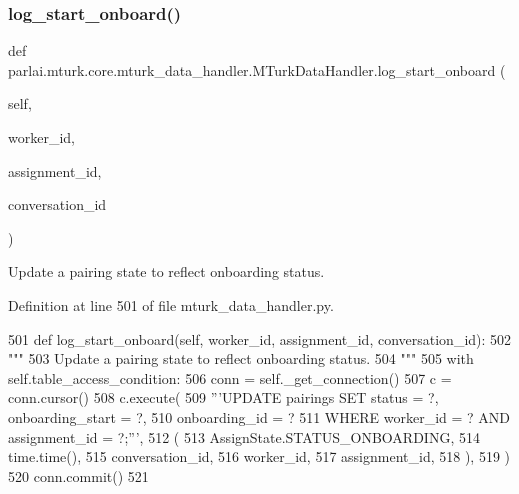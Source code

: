 \subsubsection{\texorpdfstring{log\+\_\+start\+\_\+onboard()}{log\_start\_onboard()}}
{\footnotesize\ttfamily def parlai.\+mturk.\+core.\+mturk\+\_\+data\+\_\+handler.\+M\+Turk\+Data\+Handler.\+log\+\_\+start\+\_\+onboard (\begin{DoxyParamCaption}\item[{}]{self,  }\item[{}]{worker\+\_\+id,  }\item[{}]{assignment\+\_\+id,  }\item[{}]{conversation\+\_\+id }\end{DoxyParamCaption})}

\begin{DoxyVerb}Update a pairing state to reflect onboarding status.
\end{DoxyVerb}
 

Definition at line 501 of file mturk\+\_\+data\+\_\+handler.\+py.


\begin{DoxyCode}
501     \textcolor{keyword}{def }log\_start\_onboard(self, worker\_id, assignment\_id, conversation\_id):
502         \textcolor{stringliteral}{"""}
503 \textcolor{stringliteral}{        Update a pairing state to reflect onboarding status.}
504 \textcolor{stringliteral}{        """}
505         with self.table\_access\_condition:
506             conn = self.\_get\_connection()
507             c = conn.cursor()
508             c.execute(
509                 \textcolor{stringliteral}{'''UPDATE pairings SET status = ?, onboarding\_start = ?,}
510 \textcolor{stringliteral}{                         onboarding\_id = ?}
511 \textcolor{stringliteral}{                         WHERE worker\_id = ? AND assignment\_id = ?;'''},
512                 (
513                     AssignState.STATUS\_ONBOARDING,
514                     time.time(),
515                     conversation\_id,
516                     worker\_id,
517                     assignment\_id,
518                 ),
519             )
520             conn.commit()
521 
\end{DoxyCode}
\mbox{\label{classparlai_1_1mturk_1_1core_1_1mturk__data__handler_1_1MTurkDataHandler_a373fe84924d3235c1b461f679c9a0926}} 
